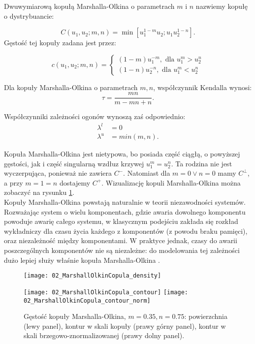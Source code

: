 \begin{df}
	Dwuwymiarową kopułą Marshalla-Olkina o parametrach $m$ i $n$ nazwiemy kopułę o dystrybuancie:
	
	$$ C(u_1, u_2; m,n) = \min[u_1^{1-m}u_2; u_1u_2^{1-n}].$$
	Gęstość tej kopuły zadana jest przez:
	
	$$
	c(u_1, u_2;m,n)=
	\begin{cases}
		(1-m)u_1^{-m},\text{ dla }u_1^m>u_2^n\\
		(1-n)u_2^{-n},\text{ dla }u_1^m<u_2^n
	\end{cases}
	$$	
\end{df}
\begin{prop}
	Dla kopuły Marshalla-Olkina o parametrach $m,n$, współczynnik Kendalla wynosi:
	$$ \tau = \frac{mn}{m-mn+n}.$$
	
	Współczynniki zależności ogonów wynoszą zaś odpowiednio:
	\begin{equation}
		\begin{split}
			\lambda^{l}&=0\\
			\lambda^{u}&=min(m,n).
		\end{split}
	\end{equation}
\end{prop}
Kopuła Marshalla-Olkina jest nietypowa, bo posiada część ciągłą, o powyższej gęstości, jak i część singularną wzdłuz krzywej $u_1^m=u_2^n$. Ta rodzina nie jest wyczerpująca, ponieważ nie zawiera $C^{-}$. Natomiast dla $m=0 \vee n=0$ mamy $C^{\perp}$, a przy $m=1=n$ dostajemy $C^{+}$. Wizualizację kopuli Marshalla-Olkina można zobaczyć na rysunku \ref{fig:marshall_olkin_copula_density}.\\
Kopuły Marshalla-Olkina powstają naturalnie w teorii niezawodności systemów. Rozważając system o wielu komponentach, gdzie awaria dowolnego komponentu powoduje awarię całego systemu, w klasycznym podejściu zakłada się rozkład wykładniczy dla czasu życia każdego z komponentów (z powodu braku pamięci), oraz niezależność między komponentami. W praktyce jednak, czasy do awarii poszczególnych komponentów nie są niezależne: do modelowania tej zależności dużo lepiej służy właśnie kopuła Marshalla-Olkina \cite{Matus2019}.\\

\begin{figure}[h]
	\centering
	\begin{minipage}{0.5\linewidth}
		\texttt{[image: 02\_MarshallOlkinCopula\_density]}
	\end{minipage}
	\begin{minipage}{0.45\linewidth}
		\texttt{[image: 02\_MarshallOlkinCopula\_contour]}
		\texttt{[image: 02\_MarshallOlkinCopula\_contour\_norm]}
	\end{minipage}
	\caption{Gęstość kopuły Marshalla-Olkina, $m=0.35,n=0.75$: powierzchnia (lewy panel), kontur w skali kopuły (prawy górny panel), kontur w skali brzegowo-znormalizowanej (prawy dolny panel). \label{fig:marshall_olkin_copula_density}}
\end{figure}



